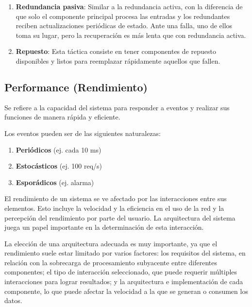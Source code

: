 \documentclass{article}
\begin{document}
\begin{itemize}
\begin{enumerate}
					\item \textbf{Redundancia pasiva}: Similar a la redundancia activa, con la diferencia de que solo el componente principal procesa las entradas y los redundantes reciben actualizaciones periódicas de estado. Ante una falla, uno de ellos toma su lugar, pero la recuperación es más lenta que con redundancia activa.
					
					\item \textbf{Repuesto}: Esta táctica consiste en tener componentes de repuesto disponibles y listos para reemplazar rápidamente aquellos que fallen.
					
					
				\end{enumerate}
				
				
			\end{itemize}
				
		
		
		
		
		\subsection{Performance \small{(Rendimiento)}}
		 Se refiere a la capacidad del sistema para responder a eventos y realizar sus funciones de manera rápida y eficiente.
		 
		 Los eventos pueden ser de las siguientes naturalezas: 
		 \begin{enumerate}
		 	\item \textbf{Periódicos} (ej. cada 10 ms)
		 	
		 	\item \textbf{Estocásticos}  (ej. 100 req/s)
		 	
		 	\item \textbf{Esporádicos}  (ej. alarma)
		 \end{enumerate}
		 
		 El rendimiento de un sistema se ve afectado por las interacciones entre sus elementos. Esto incluye la velocidad y la eficiencia en el uso de la red y la percepción del rendimiento por parte del usuario. La arquitectura del sistema juega un papel importante en la determinación de esta interacción.
		 
		 La elección de una arquitectura adecuada es muy importante, ya que el rendimiento suele estar limitado por varios factores: los requisitos del sistema, en relación con la sobrecarga de procesamiento subyacente entre diferentes componentes; el tipo de interacción seleccionado, que puede requerir múltiples interacciones para lograr resultados; y la arquitectura e implementación de cada componente, lo que puede afectar la velocidad a la que se generan o consumen los datos.
		 
\end{document}
